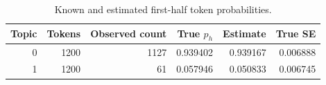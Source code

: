\par
\begin{table}[htbp]\centering
\small
\caption{Known and estimated first-half token probabilities.}
\begin{tabular}{rrrrrr}\toprule
Topic & Tokens & Observed count & True $p_h$ & Estimate & True SE \\ \midrule
0 & 1200 & 1127 & 0.939402 & 0.939167 & 0.006888 \\
1 & 1200 & 61 & 0.057946 & 0.050833 & 0.006745 \\
\bottomrule\end{tabular}
\end{table}
\par

